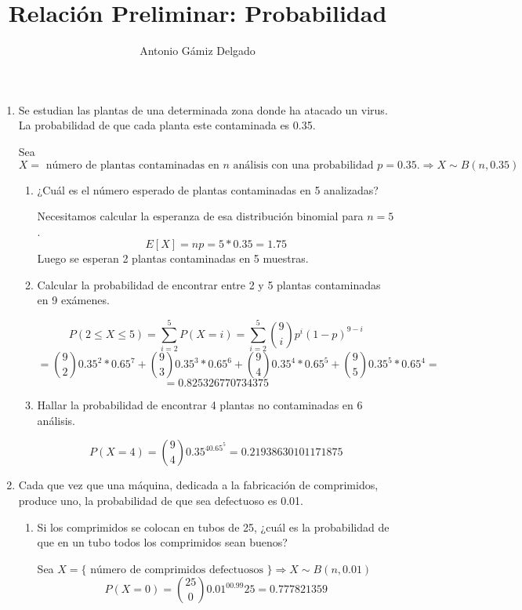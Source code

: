 \documentclass[11pt]{article}
\begin{document}
\author{Antonio Gámiz Delgado}
\title{Relación Preliminar: Probabilidad}
\maketitle

\begin{enumerate}

\item 

Se estudian las plantas de una determinada zona donde ha atacado un virus. La probabilidad de que cada planta este contaminada es 0.35.

Sea $X= \text{ número de plantas contaminadas en } n \text{ análisis con una probabilidad } p=0.35.  \Longrightarrow X \sim B(n,0.35)$ 

\begin{enumerate}
\item ¿Cuál es el número esperado de plantas contaminadas en 5 analizadas?

Necesitamos calcular la esperanza de esa distribución binomial para $n=5$.
\[
E[X]=np=5*0.35=1.75
\]
Luego se esperan 2 plantas contaminadas en 5 muestras.

\item Calcular la probabilidad de encontrar entre 2 y 5 plantas contaminadas en 9 exámenes.

\[
P(2 \leq X \leq 5) = \sum_{i=2}^5P(X=i) = \sum_{i=2}^5\binom{9}{i}p^i(1-p)^{9-i}
\]
\[
= \binom{9}{2}0.35^2*0.65^7+\binom{9}{3}0.35^3*0.65^6+\binom{9}{4}0.35^4*0.65^5+\binom{9}{5}0.35^5*0.65^4= 
\]
\[
= 0.825326770734375
\]

\item Hallar la probabilidad de encontrar 4 plantas no contaminadas en 6 análisis.

\[
P(X=4)=\binom{9}{4}0.35^40.65^5=0.21938630101171875
\]
\end{enumerate}

\item 

Cada que vez que una máquina, dedicada a la fabricación de comprimidos, produce uno, la probabilidad de que sea defectuoso es 0.01.

\begin{enumerate}
\item Si los comprimidos se colocan en tubos de 25, ¿cuál es la probabilidad de que en un tubo todos los comprimidos sean buenos?

Sea $X = \{\text{ número de comprimidos defectuosos } \} \Longrightarrow X \sim B(n,0.01)$
\[
P(X=0)=\binom{25}{0}0.01^00.99{25} = 0.777821359
\]


\end{enumerate}
\end{enumerate}
\end{document}
